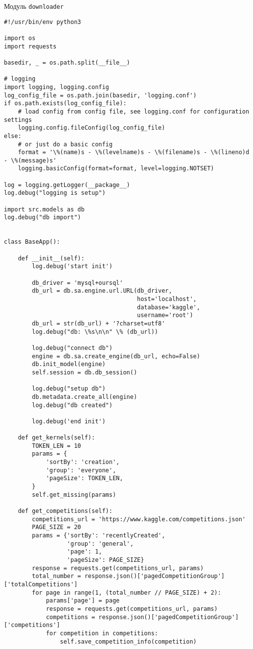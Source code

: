 \begin{center}Модуль \texttt{downloader}\end{center}

\begin{lstlisting}[style=app]
#!/usr/bin/env python3

import os
import requests

basedir, _ = os.path.split(__file__)

# logging
import logging, logging.config
log_config_file = os.path.join(basedir, 'logging.conf')
if os.path.exists(log_config_file):
    # load config from config file, see logging.conf for configuration settings
    logging.config.fileConfig(log_config_file)
else:
    # or just do a basic config
    format = '\%(name)s - \%(levelname)s - \%(filename)s - \%(lineno)d - \%(message)s'
    logging.basicConfig(format=format, level=logging.NOTSET)

log = logging.getLogger(__package__)
log.debug("logging is setup")

import src.models as db
log.debug("db import")


class BaseApp():

    def __init__(self):
        log.debug('start init')

        db_driver = 'mysql+oursql'
        db_url = db.sa.engine.url.URL(db_driver,
                                      host='localhost',
                                      database='kaggle',
                                      username='root')
        db_url = str(db_url) + '?charset=utf8'
        log.debug("db: \%s\n\n" \% (db_url))

        log.debug("connect db")
        engine = db.sa.create_engine(db_url, echo=False)
        db.init_model(engine)
        self.session = db.db_session()

        log.debug("setup db")
        db.metadata.create_all(engine)
        log.debug("db created")

        log.debug('end init')

    def get_kernels(self):
        TOKEN_LEN = 10
        params = {
            'sortBy': 'creation',
            'group': 'everyone',
            'pageSize': TOKEN_LEN,
        }
        self.get_missing(params)

    def get_competitions(self):
        competitions_url = 'https://www.kaggle.com/competitions.json'
        PAGE_SIZE = 20
        params = {'sortBy': 'recentlyCreated',
                  'group': 'general',
                  'page': 1,
                  'pageSize': PAGE_SIZE}
        response = requests.get(competitions_url, params)
        total_number = response.json()['pagedCompetitionGroup']['totalCompetitions']
        for page in range(1, (total_number // PAGE_SIZE) + 2):
            params['page'] = page
            response = requests.get(competitions_url, params)
            competitions = response.json()['pagedCompetitionGroup']['competitions']
            for competition in competitions:
                self.save_competition_info(competition)


\end{lstlisting}
